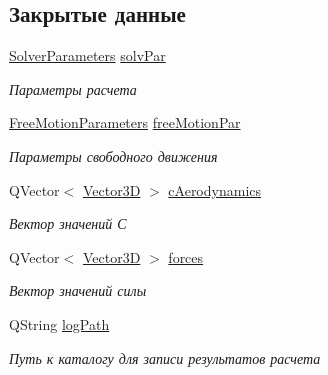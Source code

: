 \subsection*{Закрытые данные}
\begin{DoxyCompactItemize}
\item 
\mbox{\label{class_solver_a025ba583b5a9d409c2709c3353fe6528}} 
\mbox{\hyperlink{struct_solver_parameters}{Solver\+Parameters}} \mbox{\hyperlink{class_solver_a025ba583b5a9d409c2709c3353fe6528}{solv\+Par}}
\begin{DoxyCompactList}\small\item\em Параметры расчета \end{DoxyCompactList}\item 
\mbox{\label{class_solver_a2c9be370367477b6c90d32102efa157f}} 
\mbox{\hyperlink{struct_free_motion_parameters}{Free\+Motion\+Parameters}} \mbox{\hyperlink{class_solver_a2c9be370367477b6c90d32102efa157f}{free\+Motion\+Par}}
\begin{DoxyCompactList}\small\item\em Параметры свободного движения \end{DoxyCompactList}\item 
\mbox{\label{class_solver_a1689a3de99009e073fe71adaf217f198}} 
Q\+Vector$<$ \mbox{\hyperlink{class_vector3_d}{Vector3D}} $>$ \mbox{\hyperlink{class_solver_a1689a3de99009e073fe71adaf217f198}{c\+Aerodynamics}}
\begin{DoxyCompactList}\small\item\em Вектор значений С \end{DoxyCompactList}\item 
\mbox{\label{class_solver_a7a6b63bc3a9f3eb6fe78e277a284dc9b}} 
Q\+Vector$<$ \mbox{\hyperlink{class_vector3_d}{Vector3D}} $>$ \mbox{\hyperlink{class_solver_a7a6b63bc3a9f3eb6fe78e277a284dc9b}{forces}}
\begin{DoxyCompactList}\small\item\em Вектор значений силы \end{DoxyCompactList}\item 
\mbox{\label{class_solver_a5aa8351fa034173fb987c9ec93666abe}} 
Q\+String \mbox{\hyperlink{class_solver_a5aa8351fa034173fb987c9ec93666abe}{log\+Path}}
\begin{DoxyCompactList}\small\item\em Путь к каталогу для записи результатов расчета \end{DoxyCompactList}\end{DoxyCompactItemize}


